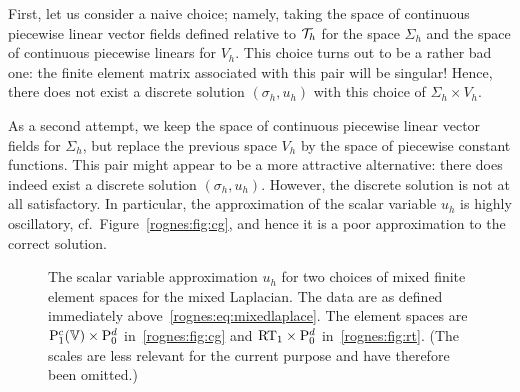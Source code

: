 First, let us consider a naive choice; namely, taking the space of
continuous piecewise linear vector fields defined relative to
$\mathcal{T}_h$ for the space $\Sigma_h$ and the space of continuous
piecewise linears for $V_h$. This choice turns out to be a rather bad
one: the finite element matrix associated with this pair will be
singular! Hence, there does not exist a discrete solution $(\sigma_h,
u_h)$ with this choice of $\Sigma_h \times V_h$.

As a second attempt, we keep the space of continuous piecewise linear
vector fields for $\Sigma_h$, but replace the previous space $V_h$ by
the space of piecewise constant functions. This pair might appear to
be a more attractive alternative: there does indeed exist a discrete
solution $(\sigma_h, u_h)$. However, the discrete solution is not at
all satisfactory. In particular, the approximation of the scalar
variable $u_h$ is highly oscillatory, cf.~Figure~\ref{rognes:fig:cg},
and hence it is a poor approximation to the correct solution.
\begin{figure}%
  \begin{center}
    \caption{The scalar variable approximation $u_h$ for two choices
      of mixed finite element spaces for the mixed Laplacian. The data
      are as defined immediately above~\eqref{rognes:eq:mixedlaplace}.
      The element spaces are $\mathrm{P}^c_1(\mathbb{V}) \times \mathrm{P}^d_0$
      in~\ref{rognes:fig:cg} and $\mathrm{RT}_1 \times \mathrm{P}^d_0$
      in~\ref{rognes:fig:rt}. (The scales are less relevant for the
      current purpose and have therefore been omitted.)}
  \end{center}
  \label{rognes:fig:example}
\end{figure}

